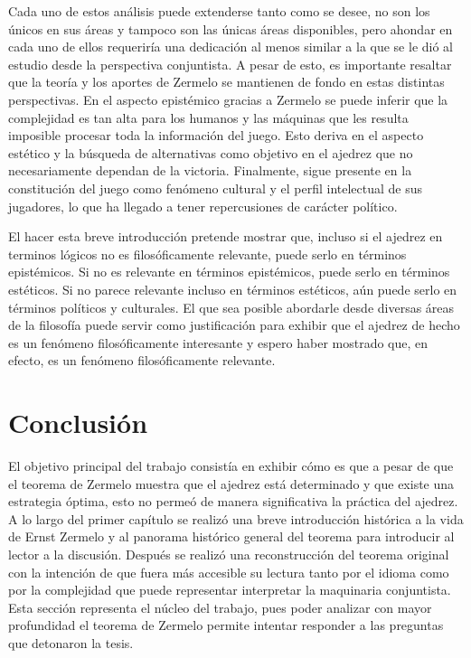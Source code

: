 \documentclass[twoside,openright,12pt,a4paper,spanish]{book}
\begin{document}
Cada uno de estos an\'alisis puede extenderse tanto como se desee, no son los \'unicos en sus \'areas y tampoco son las \'unicas \'areas disponibles, pero ahondar en cada uno de ellos requerir\'ia una dedicaci\'on al menos similar a la que se le di\'o al estudio desde la perspectiva conjuntista. A pesar de esto, es importante resaltar que la teor\'ia y los aportes de Zermelo se mantienen de fondo en estas distintas perspectivas. En el aspecto epist\'emico gracias a Zermelo se puede inferir que la complejidad es tan alta para los humanos y las máquinas que les resulta imposible procesar toda la informaci\'on del juego. Esto deriva en el aspecto est\'etico y la búsqueda de alternativas como objetivo en el ajedrez que no necesariamente dependan de la victoria. Finalmente, sigue presente en la constituci\'on del juego como fen\'omeno cultural y el perfil intelectual de sus jugadores, lo que ha llegado a tener repercusiones de car\'acter pol\'itico.

El hacer esta breve introducci\'on pretende mostrar que, incluso si el ajedrez en terminos l\'ogicos no es filos\'oficamente relevante, puede serlo en t\'erminos epist\'emicos. Si no es relevante en t\'erminos epist\'emicos, puede serlo en t\'erminos est\'eticos. Si no parece relevante incluso en t\'erminos est\'eticos, a\'un puede serlo en t\'erminos pol\'iticos y culturales. El que sea posible abordarle desde diversas \'areas de la filosof\'ia puede servir como justificaci\'on para exhibir que el ajedrez de hecho es un fen\'omeno filos\'oficamente interesante y espero haber mostrado que, en efecto, es un fenómeno filos\'oficamente relevante.


\chapter*{Conclusión}

El objetivo principal del trabajo consist\'ia en exhibir c\'omo es que a pesar de que el teorema de Zermelo muestra que el ajedrez est\'a determinado y que existe una estrategia \'optima, esto no perme\'o de manera significativa la pr\'actica del ajedrez. A lo largo del primer cap\'itulo se realiz\'o una breve introducci\'on hist\'orica a la vida de Ernst Zermelo y al panorama hist\'orico general del teorema para introducir al lector a la discusi\'on. Despu\'es se realiz\'o una reconstrucci\'on del teorema original con la intenci\'on de que fuera m\'as accesible su lectura tanto por el idioma como por la complejidad que puede representar interpretar la maquinaria conjuntista. Esta secci\'on representa el n\'ucleo del trabajo, pues poder analizar con mayor profundidad el teorema de Zermelo permite intentar responder a las preguntas que detonaron la tesis.
\end{document}
